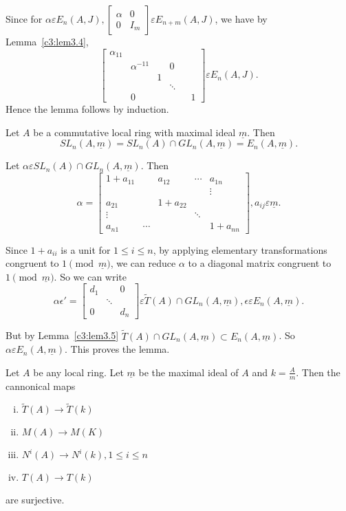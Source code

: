 \begin{Proof}
Since for $\alpha\varepsilon E_n(A,J),\begin{bmatrix}
\alpha & 0\\
0 & I_m
\end{bmatrix} \varepsilon E_{n+m}(A,J)$, we have by
Lemma~\ref{c3:lem3.4}, 
$$
\begin{bmatrix}
\alpha_{11} & & & &\\
& \alpha^{-11} & &0 &\\
& &  1 & \\
& & & \ddots &\\
& 0&& & &1
\end{bmatrix}\varepsilon E_n(A,J).
$$
Hence the lemma follows by induction.
\enprf
\end{Proof}

\begin{lem}\label{c3:lem3.6}
Let $A$ be a commutative local ring with maximal ideal
$\underline{m}.$ Then 
$$
SL_n(A,\underline{m})=SL_{n}(A)\cap GL_n(A,\underline{m})=E_n(A,\underline{m}).
$$
\end{lem}

\begin{Proof}
Let $\alpha\varepsilon SL_n(A)\cap GL_n(A,\underline{m})$. Then 
$$
\alpha=
\begin{bmatrix}
1+a_{11}& & a_{12}&\cdots & a_{1n}\\
& && &\vdots\\
a_{21} && 1+a_{22} & &\\
\vdots & & &\ddots &\\
a_{n1}& \cdots & & & 1+a_{nn}
\end{bmatrix}, a_{ij}\varepsilon\underline{m}.
$$

Since $1+a_{ii}$ is a unit for $1\leq i \leq n$, by applying
elementary transformations congruent to $1\pmod{\underline{m}}$, we
can reduce $\alpha$ to a diagonal matrix congruent to
$1\pmod{\underline{m}}$. So we can write
$$
\alpha \epsilon'=
\begin{bmatrix}
d_1 & &0\\
& \ddots &\\
0 & & d_n
\end{bmatrix} \varepsilon \tilde{T}(A)\cap GL_n(A,\underline{m}),
\epsilon \varepsilon E_n(A,\underline{m}).
$$

But by Lemma~\ref{c3:lem3.5} $\tilde{T}(A)\cap
GL_n(A,\underline{m})\subset E_n(A,\underline{m})$. So $\alpha
\varepsilon E_n(A,\underline{m})$. This proves the lemma.
\enprf
\end{Proof}

\begin{lem}\label{c3:lem3.7}
Let $A$ be any local ring. Let $\underline{m}$ be the maximal ideal of
$A$ and $k=\frac{A}{m}$. Then the cannonical maps
\begin{enumerate}[(i)]
\item $\tilde{T}(A)\rightarrow \tilde{T}(k)$
\item $M(A)\rightarrow M(K)$
\item $N^{i}(A)\rightarrow N^{i}(k), 1\leq i \leq n$
\item $T(A)\rightarrow T(k)$
\end{enumerate}
are surjective.
\end{lem}

